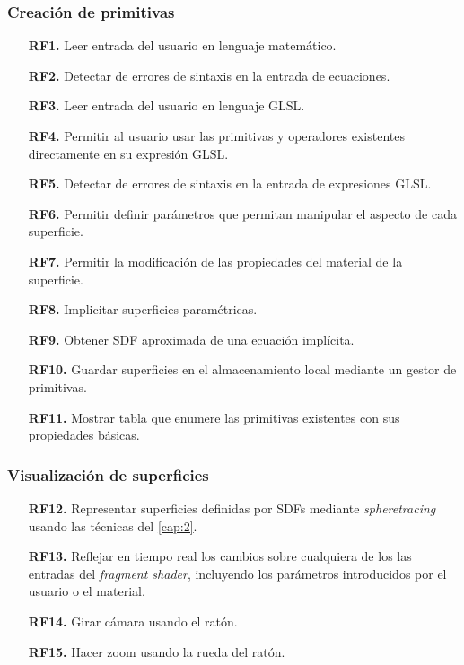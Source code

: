 \subsubsection*{Creación de primitivas}
\begin{enumerate}
    \item [\textbf{RF1.}] Leer entrada del usuario en lenguaje matemático.
    \item [\textbf{RF2.}] Detectar de errores de sintaxis en la entrada de ecuaciones.
    \item [\textbf{RF3.}] Leer entrada del usuario en lenguaje GLSL.
    \item [\textbf{RF4.}] Permitir al usuario usar las primitivas y operadores existentes directamente en su expresión GLSL.
    \item [\textbf{RF5.}] Detectar de errores de sintaxis en la entrada de expresiones GLSL.
    \item [\textbf{RF6.}] Permitir definir parámetros que permitan manipular el aspecto de cada superficie.
    \item [\textbf{RF7.}] Permitir la modificación de las propiedades del material de la superficie.
    \item [\textbf{RF8.}] Implicitar superficies paramétricas.
    \item [\textbf{RF9.}] Obtener SDF aproximada de una ecuación implícita.
    \item [\textbf{RF10.}] Guardar superficies en el almacenamiento local mediante un gestor de primitivas.
    \item [\textbf{RF11.}] Mostrar tabla que enumere las primitivas existentes con sus propiedades básicas.
\end{enumerate}

\subsubsection*{Visualización de superficies}
\begin{enumerate}
     \item [\textbf{RF12.}] Representar superficies definidas por SDFs mediante \textit{spheretracing} usando las técnicas del \autoref{cap:2}.
    \item [\textbf{RF13.}] Reflejar en tiempo real los cambios sobre cualquiera de los las entradas del \textit{fragment shader}, incluyendo los parámetros introducidos por el usuario o el material.
    \item [\textbf{RF14.}] Girar cámara usando el ratón.
    \item [\textbf{RF15.}] Hacer zoom usando la rueda del ratón.
\end{enumerate}

